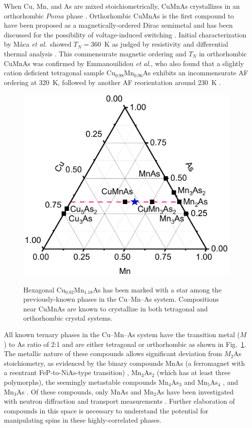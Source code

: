 \documentclass[10pt,doublespacing,edeposit]{uiucthesis2020}
\begin{document}
\begin{mainmatter}
When Cu, Mn, and As are mixed stoichiometrically, CuMnAs crystallizes in an orthorhombic $Pnma$ phase \cite{MacA2012}.
Orthorhombic CuMnAs is the first compound to have been proposed as a magnetically-ordered Dirac semimetal \cite{Tang2016} and has been discussed for the possibility of voltage-induced switching \cite{Kim2018}.
Initial characterization by M\'{a}ca \emph{et al.}\ showed $T_N = 360$~K as judged by resistivity and differential thermal analysis \cite{MacA2012}. This commensurate magnetic ordering and $T_N$ in orthorhombic CuMnAs was confirmed by Emmanouilidou \emph{et al.}, who also found that a slightly cation deficient tetragonal sample Cu$_{0.98}$Mn$_{0.96}$As exhibits an incommensurate AF ordering at 320~K, followed by another AF reorientation around 230~K \cite{emmanouilidou_magnetic_2017}.

\begin{figure}
\centering\includegraphics[width=0.6\columnwidth]{figures/ch5/phase_diagram_cropped.pdf} \\
\caption{\label{fig:phase_diagram}
{\color{black}Hexagonal Cu$_{0.82}$Mn$_{1.18}$As has been marked with a star among the previously-known phases in the Cu--Mn--As system. Compositions near CuMnAs are known to crystallize in both tetragonal and orthorhombic crystal systems.}
} 
\end{figure}

{\color{black} All known ternary phases in the Cu--Mn--As system have the transition metal ($M$) to As ratio of 2:1 and are either tetragonal or orthorhombic as shown in Fig.\ \ref{fig:phase_diagram}.}
The metallic nature of these compounds allows significant deviation from $M_2$As stoichiometry, as evidenced by the binary compounds MnAs (a ferromagnet with a reentrant FeP-to-NiAs-type transition) \cite{Pytlik1985,Schwartz1971,Glazkov2003}, Mn$_3$As$_2$ (which has at least three polymorphs)\cite{Dietrich1990,Moller1993,Hagedorn1994}, the seemingly metastable compounds Mn$_4$As$_3$ and Mn$_5$As$_4$ \cite{Hagedorn1995,Moller1993}, and Mn$_3$As \cite{nowotny_kristallchemische_1951}.
Of these compounds, only MnAs and Mn$_2$As have been investigated with neutron diffraction and transport measurements \cite{Yuzuri1960,Austin1962}.
Further elaboration of compounds in this space is necessary to understand the potential for manipulating spins in these highly-correlated phases.


\end{mainmatter}
\end{document}
